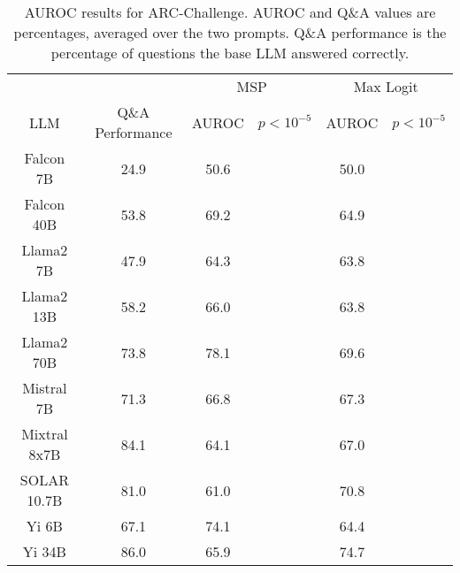 \begin{table*}
\centering
\begin{tabular}{c|c|c|c|c|c}
& & \multicolumn{2}{c|}{MSP} & \multicolumn{2}{c}{Max Logit} \\ 
LLM & Q\&A Performance & AUROC & $p < 10^{-5}$ & AUROC & $p < 10^{-5}$\\ \hline
Falcon 7B & 24.9 & 50.6 &  & 50.0 & \\
Falcon 40B & 53.8 & 69.2 &  & 64.9 & \\
Llama2 7B & 47.9 & 64.3 &  & 63.8 & \\
Llama2 13B & 58.2 & 66.0 &  & 63.8 & \\
Llama2 70B & 73.8 & 78.1 &  & 69.6 & \\
Mistral 7B & 71.3 & 66.8 &  & 67.3 & \\
Mixtral 8x7B & 84.1 & 64.1 &  & 67.0 & \\
SOLAR 10.7B & 81.0 & 61.0 &  & 70.8 & \\
Yi 6B & 67.1 & 74.1 &  & 64.4 & \\
Yi 34B & 86.0 & 65.9 &  & 74.7 & \\
\hline
\end{tabular}
\caption{AUROC results for ARC-Challenge. AUROC and Q\&A values are percentages, averaged over the two prompts. Q\&A performance is the percentage of questions the base LLM answered correctly.}
\label{tab:arc_auroc}
\end{table*}
